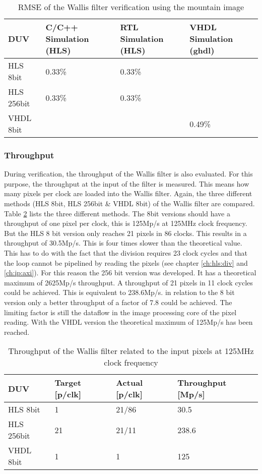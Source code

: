 \begin{table}[tb!]
    \centering
    \begin{tabular}{l l l l}
        \toprule
        DUV & C/C++ Simulation (HLS) & RTL Simulation (HLS) & VHDL Simulation (ghdl) \\
        \midrule
        HLS  8bit    & 0.33\%    & 0.33\%    & {} \\
        HLS  256bit  & 0.33\%    & 0.33\%    & {} \\
        VHDL 8bit        & {}         & {}         & 0.49\% \\
        \bottomrule
    \end{tabular}
    \caption{RMSE of the Wallis filter verification using the mountain image}
    \label{tab:rmse_mountain}
\end{table}

\subsubsection*{Throughput}
During verification, the throughput of the Wallis filter is also evaluated.
For this purpose, the throughput at the input of the filter is measured. This
means how many pixels per clock are loaded into the Wallis filter. Again, the
three different methods (HLS 8bit, HLS 256bit \& VHDL 8bit) of the Wallis filter
are compared. Table \ref{tab:throughput} lists the three different methods. The
8bit versions should have a throughput of one pixel per clock, this is 125Mp/s
at 125MHz clock frequency. But the HLS 8 bit version only reaches 21 pixels in
86 clocks. This results in a throughput of 30.5Mp/s. This is four times slower
than the theoretical value. This has to do with the fact that the division
requires 23 clock cycles and that the loop cannot be pipelined by reading the
pixels (see chapter \ref{ch:hls:div} and \ref{ch:ip:axi}). For this reason the
256 bit version was developed. It has a theoretical maximum of 2625Mp/s
throughput. A throughput of 21 pixels in 11 clock cycles could be achieved. This
is equivalent to 238.6Mp/s. in relation to the 8 bit version only a better
throughput of a factor of 7.8 could be achieved. The limiting factor is still
the dataflow in the image processing core of the pixel reading. With the VHDL version the theoretical maximum of 125Mp/s has been
reached.

\begin{table}[tb!]
    \centering
    \begin{tabular}{l l l l}
        \toprule
        DUV & Target [p/clk] & Actual [p/clk]  & Throughput [Mp/s]\\
        \midrule
        HLS  8bit    & 1     & 21/86     & 30.5\\
        HLS  256bit  & 21    & 21/11     & 238.6 \\
        VHDL 8bit        & 1     & 1         & 125 \\
        \bottomrule
    \end{tabular}
    \caption{Throughput of the Wallis filter related to the input pixels at
    125MHz clock frequency}
    \label{tab:throughput}
\end{table}


